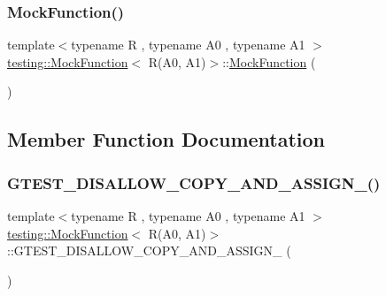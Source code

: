 \subsubsection{\texorpdfstring{MockFunction()}{MockFunction()}}
{\footnotesize\ttfamily template$<$typename R , typename A0 , typename A1 $>$ \\
\mbox{\hyperlink{classtesting_1_1_mock_function}{testing\+::\+Mock\+Function}}$<$ R(A0, A1)$>$\+::\mbox{\hyperlink{classtesting_1_1_mock_function}{Mock\+Function}} (\begin{DoxyParamCaption}{ }\end{DoxyParamCaption})\hspace{0.3cm}{\ttfamily [inline]}}



\subsection{Member Function Documentation}
\mbox{\label{classtesting_1_1_mock_function_3_01_r_07_a0_00_01_a1_08_4_a4d66c78f85fd2c438bdf3ccdd61e6edb}} 
\subsubsection{\texorpdfstring{GTEST\_DISALLOW\_COPY\_AND\_ASSIGN\_()}{GTEST\_DISALLOW\_COPY\_AND\_ASSIGN\_()}}
{\footnotesize\ttfamily template$<$typename R , typename A0 , typename A1 $>$ \\
\mbox{\hyperlink{classtesting_1_1_mock_function}{testing\+::\+Mock\+Function}}$<$ R(A0, A1)$>$\+::G\+T\+E\+S\+T\+\_\+\+D\+I\+S\+A\+L\+L\+O\+W\+\_\+\+C\+O\+P\+Y\+\_\+\+A\+N\+D\+\_\+\+A\+S\+S\+I\+G\+N\+\_\+ (\begin{DoxyParamCaption}\item[{\mbox{\hyperlink{classtesting_1_1_mock_function}{Mock\+Function}}$<$ R(A0, A1)$>$}]{ }\end{DoxyParamCaption})\hspace{0.3cm}{\ttfamily [private]}}

\mbox{\label{classtesting_1_1_mock_function_3_01_r_07_a0_00_01_a1_08_4_a5a4d673a3252cab866f0a4fa97486190}} 
